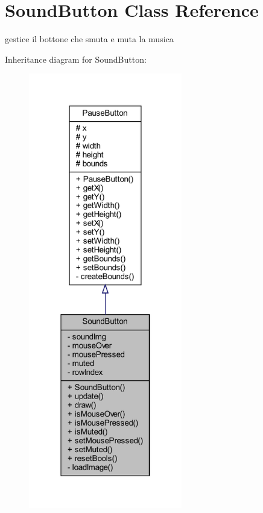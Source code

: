 \hypertarget{classui_1_1_sound_button}{}\section{Sound\+Button Class Reference}
\label{classui_1_1_sound_button}


gestice il bottone che smuta e muta la musica  




Inheritance diagram for Sound\+Button\+:\nopagebreak
\begin{figure}[H]
\begin{center}
\leavevmode
\includegraphics[width=190pt]{classui_1_1_sound_button__inherit__graph}
\end{center}
\end{figure}


